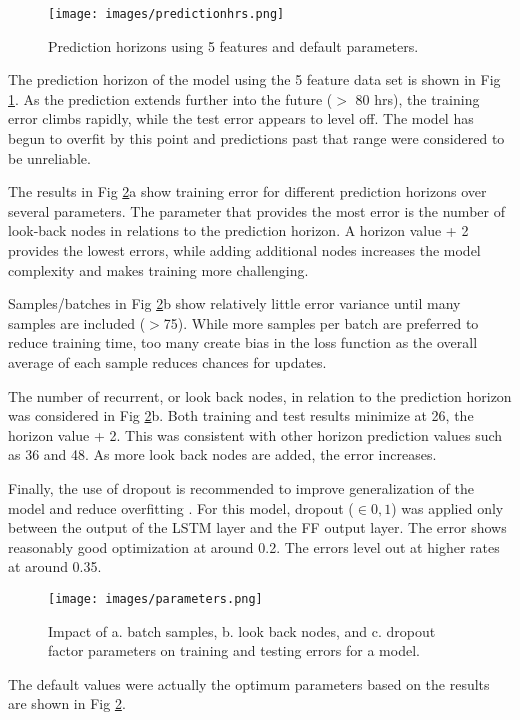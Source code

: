 \documentclass[preprint,12pt,authoryear]{elsarticle}
\begin{document}
\begin{linenumbers}
%
\begin{figure}[H]
\centering
\texttt{[image: images/predictionhrs.png]}  %
\caption{Prediction horizons using 5 features and default parameters.}
\label{fig:predictionhrs}
\end{figure}
%
The prediction horizon of the model using the 5 feature data set is shown in Fig \ref{fig:predictionhrs}.  As the prediction extends further into the future ($>$ 80 hrs), the training error climbs rapidly, while the test error appears to level off. The model has begun to overfit by this point and predictions past that range were considered to be unreliable.

The results in  Fig \ref{fig:parameters}a show training error for different prediction horizons over several parameters. The parameter that provides the most error is the number of look-back nodes in relations to the prediction horizon. A horizon value + 2 provides the lowest errors, while adding additional nodes increases the model complexity and makes training more challenging. 

Samples/batches in Fig \ref{fig:parameters}b show relatively little error variance until many samples are included ($>$75). While more samples per batch are preferred to reduce training time, too many create bias in the loss function as the overall average of each sample reduces chances for updates.

The number of recurrent, or look back nodes, in relation to the prediction horizon was considered in  Fig \ref{fig:parameters}b. Both training and test results minimize at 26, the horizon value + 2. This was consistent with other horizon prediction values such as 36 and 48. As more look back nodes are added, the error increases.

Finally, the use of dropout is recommended to improve generalization of the model and reduce overfitting \citep{Gal2016}. For this model, dropout ($\in 0,1$) was applied only between the output of the LSTM layer and the FF output layer. The error shows reasonably good optimization at around 0.2. The errors level out at higher rates at around 0.35. 
%
\begin{figure}[H]
\centering
\texttt{[image: images/parameters.png]}  %
\caption{Impact of a. batch samples, b. look back nodes, and c. dropout factor parameters on training and testing errors for a model.}
\label{fig:parameters}
\end{figure}
%
The default values were actually the optimum parameters based on the results are shown in Fig \ref{fig:parameters}.


\end{linenumbers}
\end{document}
